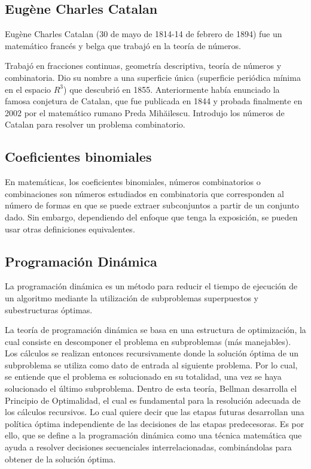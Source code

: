 \subsection{Eugène Charles Catalan}
Eugène Charles Catalan (30 de mayo de 1814-14 de febrero de 1894) fue un matemático francés y belga que trabajó en la teoría de números.

Trabajó en fracciones continuas, geometría descriptiva, teoría de números y combinatoria. Dio su nombre a una superficie única (superficie periódica mínima en el espacio  $R^3$) que descubrió en 1855. Anteriormente había enunciado la famosa conjetura de Catalan, que fue publicada en 1844 y probada finalmente en 2002 por el matemático rumano Preda Mihăilescu. Introdujo los números de Catalan para resolver un problema combinatorio. 

\subsection{Coeficientes binomiales}
En matemáticas, los coeficientes binomiales, números combinatorios o combinaciones son números estudiados en combinatoria que corresponden al número de formas en que se puede extraer subconjuntos a partir de un conjunto dado. Sin embargo, dependiendo del enfoque que tenga la exposición, se pueden usar otras definiciones equivalentes. 

\subsection{Programación Dinámica}
La programación dinámica es un método para reducir el tiempo de ejecución de un algoritmo
mediante la utilización de subproblemas superpuestos y subestructuras óptimas.

La teoría de programación dinámica se basa en una estructura de optimización, la cual consiste
en descomponer el problema en subproblemas (más manejables). Los cálculos se realizan entonces recursivamente donde la solución óptima de un subproblema se utiliza como dato de entrada
al siguiente problema. Por lo cual, se entiende que el problema es solucionado en su totalidad,
una vez se haya solucionado el último subproblema. Dentro de esta teoría, Bellman desarrolla el
Principio de Optimalidad, el cual es fundamental para la resolución adecuada de los cálculos recursivos. Lo cual quiere decir que las etapas futuras desarrollan una política óptima independiente
de las decisiones de las etapas predecesoras. Es por ello, que se define a la programación dinámica como una técnica matemática que ayuda a resolver decisiones secuenciales interrelacionadas,
combinándolas para obtener de la solución óptima.